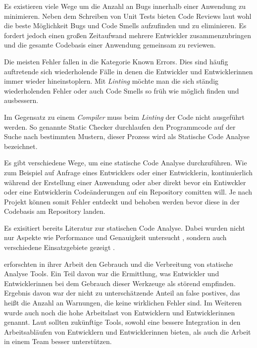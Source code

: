 Es existieren viele Wege um die Anzahl an Bugs innerhalb einer Anwendung zu minimieren. Neben dem Schreiben von Unit Tests bieten Code Reviews laut \textcite{Louridas2006} wohl die beste Möglichkeit Bugs und Code Smells aufzufinden und zu eliminieren. Es fordert jedoch einen großen Zeitaufwand mehrere Entwickler zusammenzubringen und die gesamte Codebasis einer Anwendung gemeinsam zu reviewen.

Die meisten Fehler fallen in die Kategorie Known Errors. Dies sind häufig auftretende sich wiederholende Fälle in denen die Entwickler und Entwicklerinnen immer wieder hineinstoplern. Mit \textit{Linting} möchte man die sich ständig wiederholenden Fehler oder auch Code Smells so früh wie möglich finden und ausbessern. \autocite{Louridas2006}

Im Gegensatz zu einem \textit{Compiler} muss beim \textit{Linting} der Code nicht ausgeführt werden. So genannte Static Checker durchlaufen den Programmcode auf der Suche nach bestimmten Mustern, dieser Prozess wird als Statische Code Analyse bezeichnet. \autocite{Louridas2006}

Es gibt verschiedene Wege, um eine statische Code Analyse durchzuführen. Wie zum Beispiel auf Anfrage eines Entwicklers oder einer Entwicklerin, kontinuierlich während der Erstellung einer Anwendung oder aber direkt bevor ein Entiwckler oder eine Entwicklerin Codeänderungen auf ein Repository comitten will. Je nach Projekt können somit Fehler entdeckt und behoben werden bevor diese in der Codebasis am Repository landen.\autocite{Johnson2013}

Es exisitiert bereits Literatur zur statischen Code Analyse. Dabei wurden nicht nur Aspekte wie Performance und Genauigkeit untersucht \autocite{Bessey2010}, sondern auch verschiedene Einsatzgebiete gezeigt \autocite{Bush2000}.

\textcite{Johnson2013} erforschten in ihrer Arbeit den Gebrauch und die Verbreitung von statische Analyse Tools. Ein Teil davon war die Ermittlung, was Entwickler und Entwicklerinnen bei dem Gebrauch dieser Werkzeuge als störend empfinden. Ergebnis davon war der nicht zu unterschätzende Anteil an false postives, das heißt die Anzahl an Warnungen, die keine wirklichen Fehler sind. Im Weiteren wurde auch noch die hohe Arbeitslast von Entwicklern und Entwicklerinnen genannt. Laut \textcite{Johnson2013} sollten zukünftige Tools, sowohl eine bessere Integration in den Arbeitsabläufen von Entwicklern und Entwicklerinnen bieten, als auch die Arbeit in einem Team besser unterstützen.

